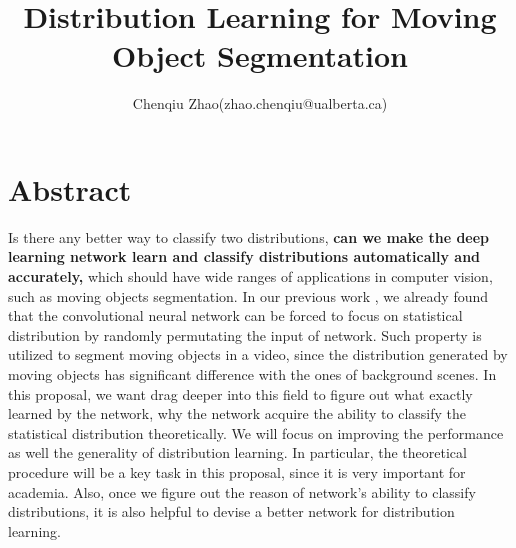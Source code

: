 \documentclass[UTF8]{article}
\title{ Distribution Learning for Moving Object Segmentation}
\author{Chenqiu Zhao(zhao.chenqiu@ualberta.ca)}
\date{}
\begin{document}
\maketitle






\section*{Abstract}
Is there any better way to classify two distributions,
\textbf{can we make the deep learning network learn and classify distributions automatically and accurately,}
which should have wide ranges of applications in computer vision, such as moving objects segmentation.
%
In our previous work \cite{2018_ICME_8486510},
we already found that the convolutional neural network can be forced to focus on statistical distribution
by randomly permutating the input of network.
%
Such property is utilized to segment moving objects in a video,
since the distribution generated by moving objects has significant difference with the ones of background scenes.
%
In this proposal,
we want drag deeper into this field to figure out what exactly learned by the network,
why the network acquire the ability to classify the statistical distribution theoretically.
%
We will focus on improving the performance as well the generality of distribution learning.
In particular,
the theoretical procedure will be a key task in this proposal,
since it is very important for academia.
%
Also,
once we figure out the reason of network's ability to classify distributions,
it is also helpful to devise a better network for distribution learning.


% 
% 
% 
\end{document}
